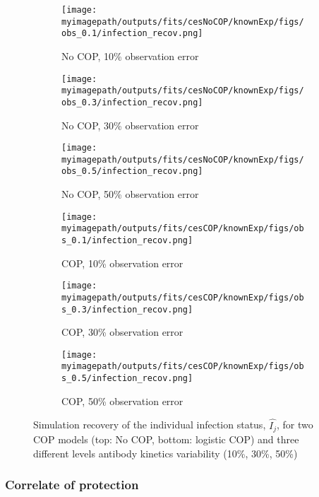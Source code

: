 \documentclass{article}
\newcommand{\myimagepath}{/Users/davidhodgson/Dropbox/Mac (3)/Documents/research/Rpackages/rjmc/}
\begin{document}
\begin{figure}[H]
    \centering
    \begin{subfigure}{0.31\textwidth}
        \centering
        \texttt{[image: \\myimagepath/outputs/fits/cesNoCOP/knownExp/figs/obs\_0.1/infection\_recov.png]}
        \caption{No COP, 10\% observation error \label{fit1:inf}}
    \end{subfigure}
    \begin{subfigure}{0.31\textwidth}
        \centering
        \texttt{[image: \\myimagepath/outputs/fits/cesNoCOP/knownExp/figs/obs\_0.3/infection\_recov.png]}
        \caption{No COP, 30\% observation error}
    \end{subfigure}
    \begin{subfigure}{0.31\textwidth}
        \centering
        \texttt{[image: \\myimagepath/outputs/fits/cesNoCOP/knownExp/figs/obs\_0.5/infection\_recov.png]}
        \caption{No COP, 50\% observation error}
    \end{subfigure}
    
  \begin{subfigure}{0.31\textwidth}
        \centering
        \texttt{[image: \\myimagepath/outputs/fits/cesCOP/knownExp/figs/obs\_0.1/infection\_recov.png]}
        \caption{ COP, 10\% observation error}
    \end{subfigure}
    \begin{subfigure}{0.31\textwidth}
        \centering
        \texttt{[image: \\myimagepath/outputs/fits/cesCOP/knownExp/figs/obs\_0.3/infection\_recov.png]}
        \caption{ COP, 30\% observation error}
    \end{subfigure}
    \begin{subfigure}{0.31\textwidth}
        \centering
        \texttt{[image: \\myimagepath/outputs/fits/cesCOP/knownExp/figs/obs\_0.5/infection\_recov.png]}
        \caption{ COP, 50\% observation error}
    \end{subfigure}
    
    \caption{Simulation recovery of the individual infection status, $\hat{I_j}$, for two COP models (top: No COP, bottom: logistic COP) and three different levels antibody kinetics variability (10\%, 30\%, 50\%)}
\end{figure}


\subsubsection{Correlate of protection}
\end{document}
